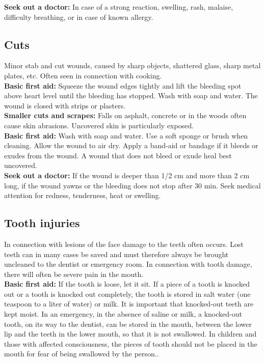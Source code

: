 \documentclass[../../../main.tex]{subfiles}
\begin{document}
\begin{multicols}{2}
\textbf{Seek out a doctor:} In case of a strong reaction, swelling, rash, malaise, difficulty breathing, or in case of known allergy. 
\\

\subsection*{Cuts} Minor stab and cut wounds, caused by sharp objects, shattered glass, sharp metal plates, etc. Often seen in connection with cooking.
\\

\textbf{Basic first aid:} Squeeze the wound edges tightly and lift the bleeding spot above heart level until the bleeding has stopped. Wash with soap and water. The wound is closed with strips or plasters.
\\

\textbf{Smaller cuts and scrapes:} Falls on asphalt, concrete or in the woods often cause skin abrasions. Uncovered skin is particularly exposed.
\\

\textbf{Basic first aid:} Wash with soap and water. Use a soft sponge or brush when cleaning. Allow the wound to air dry. Apply a band-aid or bandage if it bleeds or exudes from the wound. A wound that does not bleed or exude heal best uncovered.
\\

\textbf{Seek out a doctor:} If the wound is deeper than 1/2 cm and more than 2 cm long, if the wound yawns or the bleeding does not stop after 30 min. Seek medical attention for redness, tenderness, heat or swelling. 
\\

\subsection*{Tooth injuries} In connection with lesions of the face damage to the teeth often occurs. Lost teeth can in many cases be saved and must therefore always be brought uncleaned to the dentist or emergency room. In connection with tooth damage, there will often be severe pain in the mouth.
\\

\textbf{Basic first aid:} If the tooth is loose, let it sit. If a piece of a tooth is knocked out or a tooth is knocked out completely, the tooth is stored in salt water (one teaspoon to a liter of water) or milk. It is important that knocked-out teeth are kept moist. In an emergency, in the absence of saline or milk, a knocked-out tooth, on its way to the dentist, can be stored in the mouth, between the lower lip and the teeth in the lower mouth, so that it is not swallowed. In children and those with affected consciousness, the pieces of tooth should not be placed in the mouth for fear of being swallowed by the person..
\\


\end{multicols}
\end{document}
